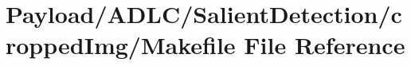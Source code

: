 \hypertarget{Payload_2ADLC_2SalientDetection_2croppedImg_2Makefile}{\section{Payload/\-A\-D\-L\-C/\-Salient\-Detection/cropped\-Img/\-Makefile File Reference}
\label{Payload_2ADLC_2SalientDetection_2croppedImg_2Makefile}
}
